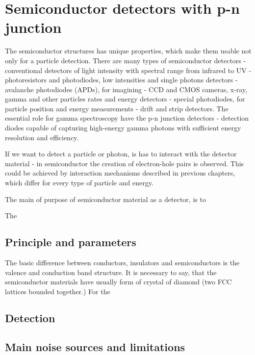 
\chapter{Semiconductor detectors with p-n junction}
The semiconductor structures has unique properties, which make them usable not only for a particle detection. There are many types of semiconductor detectors - conventional detectors of light intensity with spectral range from infrared to UV - photoresistors and photodiodes, low intensities and single photons detectors - avalanche photodiodes (APDs), for imagining - CCD and CMOS cameras, x-ray, gamma and other particles rates and energy detectors - special photodiodes, for particle position and energy measurements - drift and strip detectors. The essential role for gamma spectroscopy have the p-n junction detectors - detection diodes capable of capturing high-energy gamma photons with sufficient energy resolution and efficiency.


\par
If we want to detect a particle or photon, is has to interact with the detector material - in semiconductor the creation of electron-hole pairs is observed. This could be achieved by interaction mechanisms described in previous chapters, which differ for every type of particle and energy.

The main of purpose of semiconductor material as a detector, is to 

The  

\section{Principle and parameters}
The basic difference between conductors, insulators and semiconductors is the valence and conduction band structure.  It is necessary to say, that the semiconductor materials have usually form of crystal of diamond (two FCC lattices bounded together.) For the  
 
 

\section{Detection}

\section{Main noise sources and limitations}

